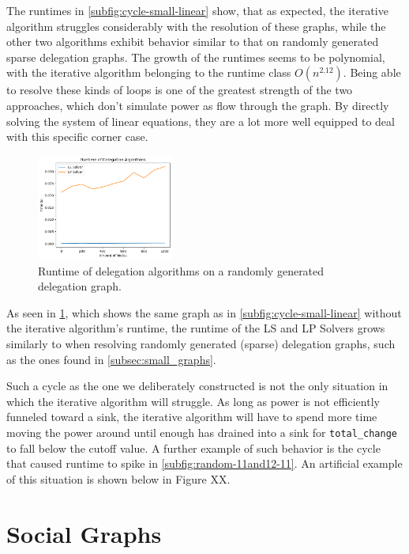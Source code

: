 The runtimes in \cref{subfig:cycle-small-linear} show, that as expected, the iterative algorithm struggles considerably with the resolution of these graphs, while the other two algorithms exhibit behavior similar to that on randomly generated sparse delegation graphs. The growth of the runtimes seems to be polynomial, with the iterative algorithm belonging to the runtime class $O(n^{2.12})$. Being able to resolve these kinds of loops is one of the greatest strength of the two approaches, which don't simulate power as flow through the graph. By directly solving the system of linear equations, they are a lot more well equipped to deal with this specific corner case.  

\begin{figure}[t]
	\centering
    	\includegraphics[width=0.4\textwidth]{0-1000_cycle_no_iterative}
    	\caption{Runtime of delegation algorithms on a randomly generated delegation graph.}
	\label{fig:cycle-small-no-iterative-linear}
\end{figure}

As seen in \cref{fig:cycle-small-no-iterative-linear}, which shows the same graph as in \cref{subfig:cycle-small-linear} without the iterative algorithm's runtime, the runtime of the LS and LP Solvers grows similarly to when resolving randomly generated (sparse) delegation graphs, such as the ones found in \cref{subsec:small_graphs}.

Such a cycle as the one we deliberately constructed is not the only situation in which the iterative algorithm will struggle. As long as power is not efficiently funneled toward a sink, the iterative algorithm will have to spend more time moving the power around until enough has drained into a sink for \texttt{total\_change} to fall below the cutoff value. A further example of such behavior is the cycle that caused runtime to spike in \cref{subfig:random-11and12-11}. An artificial example of this situation is shown below in Figure XX. 

\section{Social Graphs}

